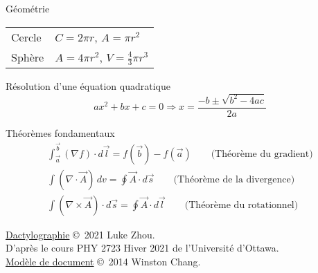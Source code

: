 \documentclass[10pt,landscape]{article}
\newcommand{\extraline}{\vspace{1em}}
\newcommand{\halfline}{\vspace{0.5em}}
\newcommand{\tableindent}{\hspace{1.5em}}
\begin{document}
\begin{multicols}{3}
Géométrie \\
\halfline
\begin{tabular}{@{\tableindent}ll@{}}
	Cercle & $C = 2\pi r $, $A =\pi r^2$ \\
	Sphère & $A = 4\pi r^2$, $V = \frac{4}{3}\pi r^3 $ \\
\end{tabular}
\extraline

Résolution d'une équation quadratique
\[ ax^2 + bx + c = 0 \Longrightarrow x = \frac{-b \pm \sqrt{b^2-4ac} }{2a} \]

Théorèmes fondamentaux
\begin{gather*}
\int_{\vec{a}}^{\vec{b}} (\nabla f)\cdot d\vec{l} = f(\vec{b}) - f(\vec{a}) 
\qquad\text{(Théorème du gradient)} \\
\int (\nabla \cdot \vec{A}) \, dv = \oint \vec{A}\cdot d\vec{s}
\qquad\text{(Théorème de la divergence)} \\
\int (\nabla\times\vec{A})\cdot d\vec{s} = \oint \vec{A}\cdot d\vec{l}
\qquad\text{(Théorème du rotationnel)}
\end{gather*}






\hrulefill


\scriptsize

\href{https://github.com/zhouluke/PhysicsFormulas}{Dactylographie}  \copyright\ 2021 Luke Zhou. \\
D'après le cours PHY 2723 Hiver 2021 de l'Université d'Ottawa. \\
\href{http://wch.github.io/latexsheet/}{Modèle de document}  \copyright\ 2014 Winston Chang.


\end{multicols}
\end{document}
